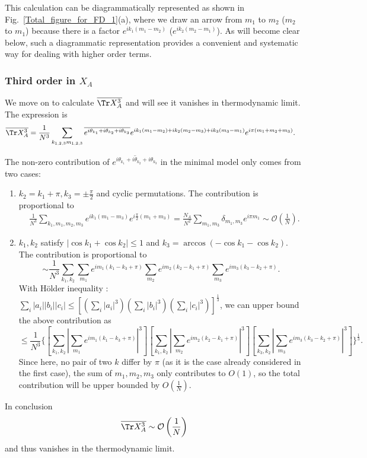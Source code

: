 This calculation can be diagrammatically represented as shown in Fig.~\ref{Total_figure_for_FD_1}(a), where we draw an arrow from $m_1$ to $m_2$ ($m_2$ to $m_1$) because there is a factor $e^{ik_1(m_1-m_2)}$ ($e^{ik_2(m_2-m_1)}$). As will become clear below, such a diagrammatic representation provides a convenient and systematic way for dealing with higher order terms.

\subsubsection{Third order in $X_{A}$}
We move on to calculate $\overline{\Tr X_{A}^{3}}$ and will %
see %
it vanishes in thermodynamic limit. The expression is 
\begin{align*}
\overline{\Tr X_{A}^{3}} & =\frac{1}{N^{3}}\sum_{k_{1,2,3}m_{1,2,3}}\overline{e^{i\theta_{k_{1}}+i\theta_{k_{2}}+i\theta_{k_{3}}}}e^{ik_{1}(m_{1}-m_{2})+ik_{2}(m_{2}-m_{3})+ik_{3}(m_{3}-m_{1})}e^{i\pi(m_{1}+m_{2}+m_{3})}.
\end{align*}

The non-zero contribution of $\overline{e^{i\theta_{k_{1}}+i\theta_{k_{2}}+i\theta_{k_{3}}}}$
in the minimal model only comes from two cases:
\begin{enumerate}
\item $k_{2}=k_{1}+\pi,k_{3}=\pm\frac{\pi}{2}$ and cyclic permutations.
The contribution is proportional to 
\begin{align*}
 & \frac{1}{N^{3}}\sum_{k_{1},m_{1},m_{2},m_{3}}e^{ik_{1}(m_{1}-m_{3})}e^{i\frac{\pi}{2}(m_{1}+m_{3})} =\frac{N_{A}}{N^{2}}\sum_{m_{1},m_{3}}\delta_{m_{1},m_{3}}e^{i\pi m_{1}}\sim \mathcal{O}\left(\frac{1}{N}\right).
\end{align*}
\item $k_{1},k_{2}$ satisfy $|\cos k_{1}+\cos k_{2}|\leq1$ and $k_{3}=\arccos(-\cos k_{1}-\cos k_{2})$.
The contribution is proportional to
\[
\sim\frac{1}{N^{3}}\sum_{k_{1},k_{2}}\sum_{m_{1}}e^{im_{1}(k_{1}-k_{3}+\pi)}\sum_{m_{2}}e^{im_{2}(k_{2}-k_{1}+\pi)}\sum_{m_{3}}e^{im_{3}(k_{3}-k_{2}+\pi)}.
\]
With H\"older inequality \citep{hardy1988inequalities}: $\sum_{i}|a_{i}||b_{i}||c_{i}|\leq[(\sum_{i}|a_{i}|^{3})(\sum_{i}|b_{i}|^{3})(\sum_{i}|c_{i}|^{3})]^{\frac{1}{3}}$,
we can upper bound the above contribution as 
\[
\leq\frac{1}{N^{3}}\{[\sum_{k_{1},k_{2}}|\sum_{m_{1}}e^{im_{1}(k_{1}-k_{3}+\pi)}|^{3}][\sum_{k_{1},k_{2}}|\sum_{m_{2}}e^{im_{2}(k_{2}-k_{1}+\pi)}|^{3}][\sum_{k_{3},k_{2}}|\sum_{m_{3}}e^{im_{3}(k_{3}-k_{2}+\pi)}|^{3}]\}^{\frac{1}{3}}.
\]
Since here, no pair of two $k$ differ by $\pi$ (as it is the case
already considered in the first case), the sum of $m_{1},m_{2},m_{3}$
only contributes to $O(1)$, so the total contribution will be upper
bounded by $O(\frac{1}{N})$.
\end{enumerate}
In conclusion
\[
\overline{\Tr X_{A}^{3}}\sim \mathcal{O}\left(\frac{1}{N}\right)
\]
and thus vanishes in the thermodynamic limit. 


